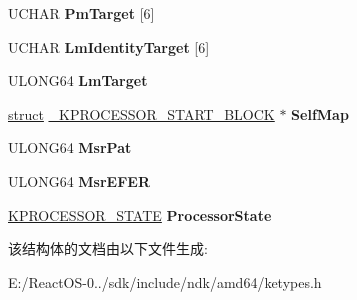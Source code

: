 \begin{DoxyCompactItemize}
U\+C\+H\+AR {\bfseries Pm\+Target} \mbox{[}6\mbox{]}
\item 
\mbox{\label{struct___k_p_r_o_c_e_s_s_o_r___s_t_a_r_t___b_l_o_c_k_a0dcf29779c188d12febd4027cc2f87c6}} 
U\+C\+H\+AR {\bfseries Lm\+Identity\+Target} \mbox{[}6\mbox{]}
\item 
\mbox{\label{struct___k_p_r_o_c_e_s_s_o_r___s_t_a_r_t___b_l_o_c_k_ad91341f430f4c785686e7578362047d9}} 
U\+L\+O\+N\+G64 {\bfseries Lm\+Target}
\item 
\mbox{\label{struct___k_p_r_o_c_e_s_s_o_r___s_t_a_r_t___b_l_o_c_k_a53733eb46704948ba3e0b4c2eefdeb48}} 
\hyperlink{interfacestruct}{struct} \hyperlink{struct___k_p_r_o_c_e_s_s_o_r___s_t_a_r_t___b_l_o_c_k}{\+\_\+\+K\+P\+R\+O\+C\+E\+S\+S\+O\+R\+\_\+\+S\+T\+A\+R\+T\+\_\+\+B\+L\+O\+CK} $\ast$ {\bfseries Self\+Map}
\item 
\mbox{\label{struct___k_p_r_o_c_e_s_s_o_r___s_t_a_r_t___b_l_o_c_k_a9bddf4c4fe75100329e81785955bbed2}} 
U\+L\+O\+N\+G64 {\bfseries Msr\+Pat}
\item 
\mbox{\label{struct___k_p_r_o_c_e_s_s_o_r___s_t_a_r_t___b_l_o_c_k_a5ae3c12f53f6276fc252d6be9ac523e9}} 
U\+L\+O\+N\+G64 {\bfseries Msr\+E\+F\+ER}
\item 
\mbox{\label{struct___k_p_r_o_c_e_s_s_o_r___s_t_a_r_t___b_l_o_c_k_a076a0168fd4f38beae4b191e71d408e0}} 
\hyperlink{struct___k_p_r_o_c_e_s_s_o_r___s_t_a_t_e}{K\+P\+R\+O\+C\+E\+S\+S\+O\+R\+\_\+\+S\+T\+A\+TE} {\bfseries Processor\+State}
\end{DoxyCompactItemize}


该结构体的文档由以下文件生成\+:\begin{DoxyCompactItemize}
\item 
E\+:/\+React\+O\+S-\/0../sdk/include/ndk/amd64/ketypes.\+h\end{DoxyCompactItemize}
